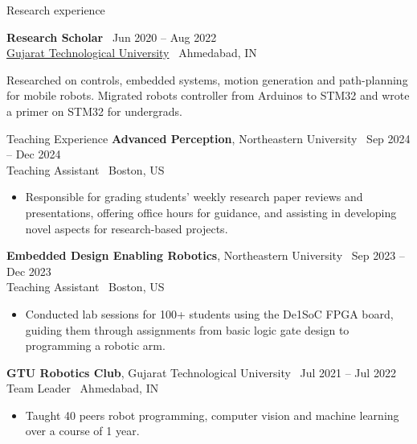 \documentclass{resume}
\begin{document}
\begin{rSection}{Research experience}
\begin{cvitems}
\end{cvitems}
{\bf Research Scholar} \hfill {\ Jun 2020 -- Aug 2022 }\\ 
{\href{https://www.gtu.ac.in/}{Gujarat Technological University}} \hfill {\ {Ahmedabad, IN}}
\begin{cvitems}
    \item Researched on controls, embedded systems, motion generation and path-planning for mobile robots. Migrated robots controller from Arduinos to STM32 and wrote a primer on STM32 for undergrads.
\end{cvitems}
\end{rSection}


\begin{rSection}{Teaching Experience}
% 
{\bf Advanced Perception}{, Northeastern University} \hfill {\ Sep 2024 -- Dec 2024}\\
Teaching Assistant \hfill {\ {Boston, US}}
\begin{itemize}
  \item \vspace{-0.5em} Responsible for grading students’ weekly research paper reviews and presentations, offering office hours for guidance, and assisting in developing novel aspects for research-based projects.
 \vspace{-0.3em}
\end{itemize} 
{\bf Embedded Design Enabling Robotics}{, Northeastern University} \hfill {\ Sep 2023 -- Dec 2023}\\
Teaching Assistant \hfill {\ {Boston, US}}
\begin{itemize}
  \item \vspace{-0.5em} Conducted lab sessions for 100+ students using the De1SoC FPGA board, guiding them through assignments from basic logic gate design to programming a robotic arm.
 \vspace{-0.3em}
\end{itemize} 

{\bf GTU Robotics Club}{, Gujarat Technological University} \hfill {\ Jul 2021 -- Jul 2022}\\
Team Leader \hfill {\ {Ahmedabad, IN}}
\begin{itemize}
  \item \vspace{-0.5em} Taught 40 peers robot programming, computer vision and machine learning over a course of 1 year. \vspace{-0.3em}
\end{itemize} 

\end{rSection}
\end{document}
